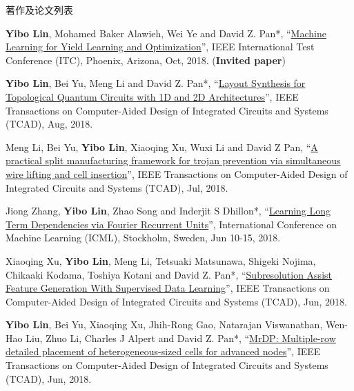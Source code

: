 \begin{rSection}{著作及论文列表}
\begin{description}[font=\normalfont, rightmargin=2em]
\item[{[C30]}]{
        \textbf{Yibo Lin}, Mohamed Baker Alawieh, Wei Ye and David Z. Pan*, 
    ``\href{https://doi.org/10.1109/TEST.2018.8624733}{Machine Learning for Yield Learning and Optimization}'', 
    IEEE International Test Conference (ITC), Phoenix, Arizona, Oct, 2018.
    (\textbf{Invited paper})
}
            

\item[{[J29]}]{
        \textbf{Yibo Lin}, Bei Yu, Meng Li and David Z. Pan*, 
    ``\href{https://doi.org/10.1109/TCAD.2017.2760511}{Layout Synthesis for Topological Quantum Circuits with 1D and 2D Architectures}'', 
    IEEE Transactions on Computer-Aided Design of Integrated Circuits and Systems (TCAD), Aug, 2018.
    
}
            

\item[{[J28]}]{
        Meng Li, Bei Yu, \textbf{Yibo Lin}, Xiaoqing Xu, Wuxi Li and David Z Pan, 
    ``\href{https://doi.org/10.1109/TCAD.2018.2859402}{A practical split manufacturing framework for trojan prevention via simultaneous wire lifting and cell insertion}'', 
    IEEE Transactions on Computer-Aided Design of Integrated Circuits and Systems (TCAD), Jul, 2018.
    
}
            

\item[{[C27]}]{
        Jiong Zhang, \textbf{Yibo Lin}, Zhao Song and Inderjit S Dhillon*, 
    ``\href{https://arxiv.org/pdf/1803.06585.pdf}{Learning Long Term Dependencies via Fourier Recurrent Units}'', 
    International Conference on Machine Learning (ICML), Stockholm, Sweden, Jun 10-15, 2018.
    
}
            

\item[{[J26]}]{
        Xiaoqing Xu, \textbf{Yibo Lin}, Meng Li, Tetsuaki Matsunawa, Shigeki Nojima, Chikaaki Kodama, Toshiya Kotani and David Z. Pan*, 
    ``\href{https://doi.org/10.1109/TCAD.2017.2748029}{Subresolution Assist Feature Generation With Supervised Data Learning}'', 
    IEEE Transactions on Computer-Aided Design of Integrated Circuits and Systems (TCAD), Jun, 2018.
    
}
            

\item[{[J25]}]{
        \textbf{Yibo Lin}, Bei Yu, Xiaoqing Xu, Jhih-Rong Gao, Natarajan Viswanathan, Wen-Hao Liu, Zhuo Li, Charles J Alpert and David Z. Pan*, 
    ``\href{https://doi.org/10.1109/TCAD.2017.2748025}{MrDP: Multiple-row detailed placement of heterogeneous-sized cells for advanced nodes}'', 
    IEEE Transactions on Computer-Aided Design of Integrated Circuits and Systems (TCAD), Jun, 2018.
    
}
\end{description}
\end{rSection}
